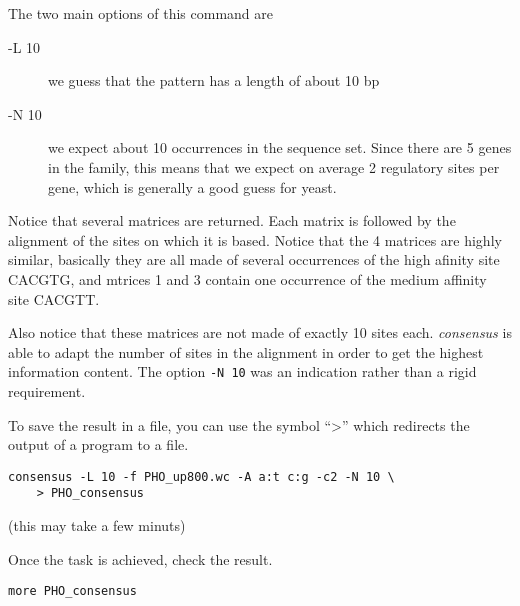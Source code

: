 The two main options of this command are 

\begin{description}
\item[-L 10] we guess that the pattern has a length of about 10 bp

\item[-N 10] we expect about 10 occurrences in the sequence set. Since
there are 5 genes in the family, this means that we expect on average
2 regulatory sites per gene, which is generally a good guess for
yeast.

\end{description}

Notice that several matrices are returned. Each matrix is followed by
the alignment of the sites on which it is based. Notice that the 4
matrices are highly similar, basically they are all made of several
occurrences of the high afinity site CACGTG, and mtrices 1 and 3
contain one occurrence of the medium affinity site CACGTT. 

Also notice that these matrices are not made of exactly 10 sites
each. \textit{consensus} is able to adapt the number of sites in the
alignment in order to get the highest information content. The option
\texttt{-N 10} was an indication rather than a rigid requirement.

To save the result in a file, you can use the symbol ``>'' which
redirects the output of a program to a file. 

\begin{verbatim}
consensus -L 10 -f PHO_up800.wc -A a:t c:g -c2 -N 10 \
    > PHO_consensus
\end{verbatim}

(this may take a few minuts)

Once the task is achieved, check the result.

\begin{verbatim}
more PHO_consensus
\end{verbatim}

